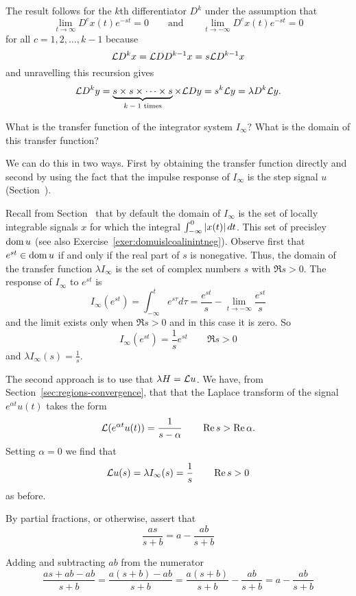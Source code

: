 \begin{excersizelist}
\begin{solution}
The result follows for the $k$th differentiator $D^k$ under the assumption that
\[
\lim_{t\to\infty} D^{c}x(t) e^{-st} = 0 \qquad \text{and} \qquad \lim_{t\to-\infty} D^{c}x(t) e^{-st} = 0
\]
for all $c = 1, 2, \dots, k-1$ because
\[
\mathcal L D^k x = \mathcal L D D^{k-1} x= s \mathcal L D^{k-1}x 
\]
and unravelling this recursion gives
\[
\mathcal L D^k y  = \underbrace{s \times s \times \dots \times s}_{\text{$k-1$ times}} \times \mathcal L D y = s^k \mathcal L y  = \lambda D^k \mathcal L y.
\]
\end{solution}


\item What is the transfer function of the integrator system $I_\infty$?  What is the domain of this transfer function? 
\begin{solution}
We can do this in two ways.  First by obtaining the transfer function directly and second by using the fact that the impulse response of $I_\infty$ is the step signal $u$ (Section~).

Recall from Section~ that by default the domain of $I_\infty$ is the set of locally integrable signals $x$ for which the integral $\int_{-\infty}^0 \left\vert x(t) \right\vert dt$.  This set of precisley $\operatorname{dom} u$ (see also Exercise~\ref{exer:domuislcoalinintneg}).  Observe first that $e^{st} \in \operatorname{dom} u$ if and only if the real part of $s$ is nonegative.  Thus, the domain of the transfer function $\lambda I_{\infty}$ is the set of complex numbers $s$ with $\Re s > 0$.  The response of $I_\infty$ to $e^{st}$ is
\[
I_\infty(e^{st}) = \int_{-\infty}^t e^{s\tau} d\tau = \frac{e^{st}}{s} - \lim_{t\to -\infty}\frac{e^{st}}{s}
\]
and the limit exists only when $\Re{s} > 0$ and in this case it is zero.  So
\[
I_\infty(e^{st}) = \frac{1}{s} e^{st} \qquad \Re{s} > 0
\]
and $\lambda I_\infty(s) = \tfrac{1}{s}$.

The second approach is to use that $\lambda H = \mathcal L u$.  We have, from Section~\ref{sec:regions-convergence}, that that the Laplace transform of the signal $e^{\alpha t} u(t)$ takes the form
\[
\mathcal L(e^{ \alpha t}u(t)) = \frac{1}{s-\alpha} \qquad \operatorname{Re} s > \operatorname{Re} \alpha.
\]
Setting $\alpha = 0$ we find that
\[
\mathcal L u(s) = \lambda I_\infty(s) = \frac{1}{s} \qquad \operatorname{Re} s > 0
\]
as before.
\end{solution}


\item \label{exer:partialfracfirstorder} By partial fractions, or otherwise, assert that
\[
\frac{as}{s+b} = a - \frac{ab}{s+b}
\]
\begin{solution}
Adding and subtracting $ab$ from the numerator
\[
\frac{as+ab-ab}{s+b} = \frac{a(s+b)-ab}{s+b} = \frac{a(s+b)}{s+b} - \frac{ab}{s+b} = a - \frac{ab}{s+b}
\]
\end{solution}


\end{excersizelist}
